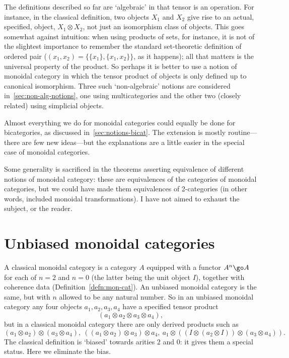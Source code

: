 The definitions described so far are `algebraic' in that tensor is an
operation.  For instance, in the classical definition, two objects $X_1$
and $X_2$ give rise to an actual, specified, object, $X_1 \otimes X_2$, not
just an isomorphism class of objects.  This goes somewhat against
intuition: when using products of sets, for instance, it is not of the
slightest importance to remember the standard set-theoretic definition of
ordered pair ($(x_1, x_2) = \{ \{x_1\}, \{x_1, x_2\} \}$, as it happens);
all that matters is the universal property of the product.  So perhaps it
is better to use a notion of monoidal category in which the tensor product
of objects is only defined up to canonical isomorphism.  Three such
`non-algebraic' notions are considered in~\ref{sec:non-alg-notions}, one
using multicategories and the other two (closely related) using simplicial
objects.

Almost everything we do for monoidal categories could equally be done for
bicategories, as discussed in~\ref{sec:notions-bicat}.  The extension is
mostly routine---there are few new ideas---but the explanations are a
little easier in the special case of monoidal categories.  

Some generality is sacrificed in the theorems asserting equivalence of
different notions of monoidal category: these are equivalences of the
categories of monoidal categories, but we could have made them equivalences
of 2-categories (in other words, included monoidal transformations).  I
have not aimed to exhaust the subject, or the reader.



\section{Unbiased monoidal categories}

A classical monoidal category is a category $A$ equipped with a functor
$A^n \go A$ for each of $n=2$ and $n=0$ (the latter being the unit object
$I$), together with coherence data (Definition~\ref{defn:mon-cat}).  An
unbiased%
%
%
monoidal category is the same, but with $n$ allowed to be any
natural number.  So in an unbiased monoidal category any four objects $a_1,
a_2, a_3, a_4$ have a specified tensor product
\[
(a_1 \otimes a_2 \otimes a_3 \otimes a_4),
\]
but in a classical monoidal category there are only derived products such
as
\[
(a_1 \otimes a_2) \otimes (a_3 \otimes a_4), 
\  
((a_1 \otimes a_2) \otimes a_3) \otimes a_4,
\  
a_1 \otimes ((I \otimes (a_2 \otimes I)) \otimes (a_3 \otimes a_4)).
\]
The classical definition is `biased' towards arities $2$ and $0$: it gives
them a special status.  Here we eliminate the bias.  

